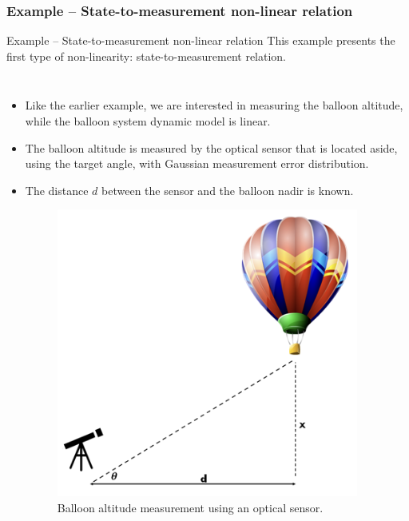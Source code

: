 \subsubsection{Example – State-to-measurement non-linear relation}
\begin{frame}{Example – State-to-measurement non-linear relation}
This example presents the first type of non-linearity: state-to-measurement relation.
\begin{columns}
        \begin{itemize}

            \item Like the earlier example, we are interested in measuring the balloon altitude, while the balloon system dynamic model is linear.
            
            \item The balloon altitude is measured by the optical sensor that is located aside, using the target angle, with Gaussian measurement error distribution.
            
            \item The distance $d$ between the sensor and the balloon nadir is known. 

            \begin{figure}
                \centering
                \includegraphics[width=0.55\linewidth]{Figures//Background3/Ballon_Optical sensor_nonlinear.png}
                \vspace{-8pt}
                \caption{Balloon altitude measurement using an optical sensor.}
            \end{figure}
        \end{itemize}
        

\end{columns}
\end{frame}
